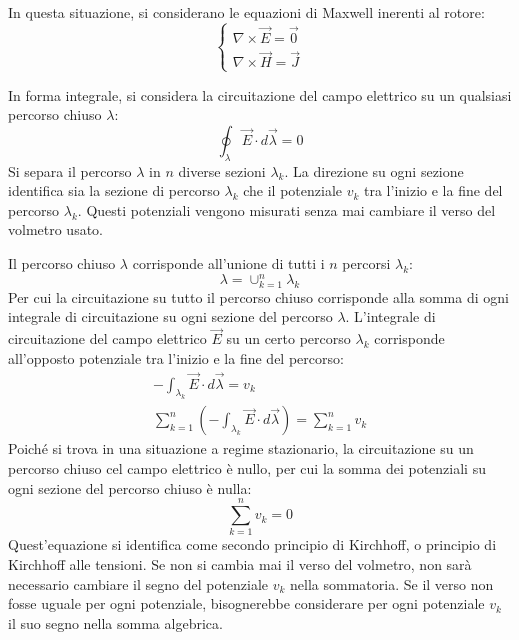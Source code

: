 \documentclass{article}
\numberwithin{equation}{subsection}
\begin{document}
In questa situazione, si considerano le equazioni di Maxwell inerenti al rotore:
\begin{equation*}
    \begin{cases}
        \nabla\times\vec{E}=\vec0\\
        \nabla\times\vec{H}=\vec{J}
    \end{cases}
\end{equation*}


In forma integrale, si considera la circuitazione del campo elettrico su un qualsiasi percorso chiuso $\lambda$:
\begin{equation*}
    \displaystyle\oint_{\lambda}\vec{E}\cdot d\vec{\lambda}=0
\end{equation*}
Si separa il percorso $\lambda$ in $n$ diverse sezioni $\lambda_k$. La direzione su ogni sezione identifica sia la sezione di percorso $\lambda_k$ che il potenziale $v_k$ tra 
l'inizio e la fine del percorso $\lambda_k$. Questi potenziali vengono misurati senza mai cambiare il verso del volmetro usato. 

Il percorso chiuso $\lambda$ corrisponde all'unione di tutti i $n$ percorsi $\lambda_k$:
\begin{equation*}
    \lambda=\cup_{k=1}^n\lambda_k
\end{equation*}
Per cui la circuitazione su tutto il percorso chiuso corrisponde alla somma di ogni integrale di circuitazione su ogni sezione del percorso $\lambda$. L'integrale di circuitazione 
del campo elettrico $\vec{E}$ su un certo percorso $\lambda_k$ corrisponde all'opposto potenziale tra l'inizio e la fine del percorso:
\begin{gather*}
    -\int_{\lambda_k}\vec{E}\cdot d\vec{\lambda}=v_k\\
    \displaystyle\sum_{k=1}^n\left(-\int_{\lambda_k}\vec{E}\cdot d\vec{\lambda}\right)=\sum_{k=1}^nv_k
\end{gather*}
Poiché si trova in una situazione a regime stazionario, la circuitazione su un percorso chiuso cel campo elettrico è nullo, per cui la somma dei potenziali su ogni sezione 
del percorso chiuso è nulla:
\begin{equation}
    \displaystyle\sum_{k=1}^nv_k=0
\end{equation}
Quest'equazione si identifica come secondo principio di Kirchhoff, o principio di Kirchhoff alle tensioni. 
Se non si cambia mai il verso del volmetro, non sarà necessario cambiare il segno del potenziale $v_k$ nella sommatoria. Se il verso non fosse uguale per ogni potenziale, 
bisognerebbe considerare per ogni potenziale $v_k$ il suo segno nella somma algebrica. 
\end{document}
